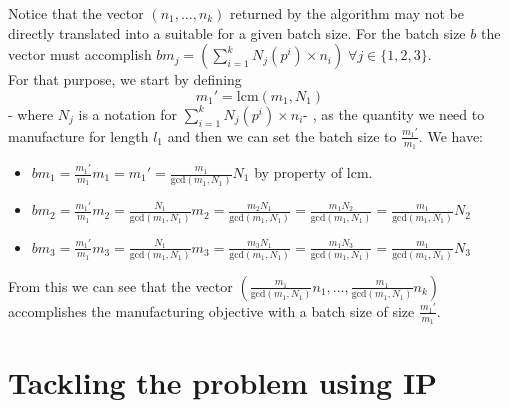 \documentclass[12pt, letterpaper]{article}
\begin{document}
Notice that the vector $(n_1, \dots, n_k)$ returned by the algorithm may not be directly translated into a suitable for a given batch size. For the batch size $b$ the vector must accomplish $bm_{j} = (\sum_{i=1}^k N_{j}(p^i)\times n_i)\;\forall j\in\{1,2,3\}$.
\vspace{10px}\\
For that purpose, we start by defining
$$m_1' = \text{lcm}(m_1, N_1)$$
- where $N_j$ is a notation for $\sum_{i=1}^k N_{j}(p^i)\times n_i$- , as the quantity we need to manufacture for length $l_1$ and then we can set the batch size to $\frac{m_1'}{m_1}$. We have:
\begin{itemize}
    \item $bm_1 = \frac{m_1'}{m_1}m_1 = m_1' = \frac{m_1}{\text{gcd}(m_1, N_1)}N_1$ by property of lcm.
    \item $bm_2 = \frac{m_1'}{m_1}m_2 = \frac{N_1}{\text{gcd}(m_1, N_1)}m_2 = \frac{m_2N_1}{\text{gcd}(m_1, N_1)} = \frac{m_1N_2}{\text{gcd}(m_1, N_1)} = \frac{m_1}{\text{gcd}(m_1, N_1)}N_2$
    \item $bm_3= \frac{m_1'}{m_1}m_3 = \frac{N_1}{\text{gcd}(m_1, N_1)}m_3 = \frac{m_3N_1}{\text{gcd}(m_1, N_1)} = \frac{m_1N_3}{\text{gcd}(m_1, N_1)} = \frac{m_1}{\text{gcd}(m_1, N_1)}N_3$
\end{itemize}
\vspace{10px}
\par
From this we can see that the vector $(\frac{m_1}{\text{gcd}(m_1, N_1)}n_1, \dots, \frac{m_1}{\text{gcd}(m_1, N_1)}n_k)$ accomplishes the manufacturing objective with a batch size of size $\frac{m_1'}{m_1}$.


\section{Tackling the problem using IP}
\end{document}
